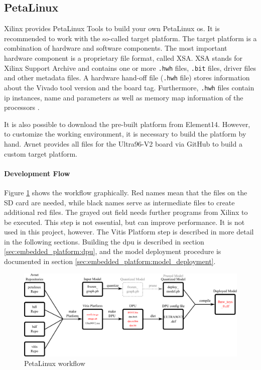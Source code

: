 \subsection{PetaLinux}
\label{subsec:embedded_platform:operating_systems:petalinux}

Xilinx provides PetaLinux Tools to build your own PetaLinux \acrshort{os}.
It is recommended to work with the so-called target platform.
The target platform is a combination of hardware and software components.
The most important hardware component is a proprietary file format, called XSA.
XSA stands for Xilinx Support Archive and contains one or more \texttt{.hwh} files, \texttt{.bit} files, driver files and other metadata files.
A hardware hand-off file (\texttt{.hwh} file) stores information about the Vivado tool version and the board tag.
Furthermore, \texttt{.hwh} files contain \acrshort{ip} instances, name and parameters as well as memory map information of the processors \cite{vitis_user_guide}.

It is also possible to download the pre-built platform from Element14.
However, to customize the working environment, it is necessary to build the platform by hand.
Avnet provides all files for the Ultra96-V2 board via GitHub to build a custom target platform.

\paragraph{Development Flow}
Figure \ref{fig:petalinux_workflow} shows the workflow graphically.
Red names mean that the files on the SD card are needed, while black names serve as intermediate files to create additional red files.
The grayed out field needs further programs from Xilinx to be executed.
This step is not essential, but can improve performance.
It is not used in this project, however.
The Vitis Platform step is described in more detail in the following sections.
Building the \acrshort{dpu} is described in section \ref{sec:embedded_platform:dpu}, and the model deployment procedure is documented in section \ref{sec:embedded_platform:model_deployment}.

\begin{figure}
  \centering
  \includegraphics[width=1\textwidth]{graphics/workflow.pdf}
  \caption{PetaLinux workflow}
  \label{fig:petalinux_workflow}
\end{figure}

